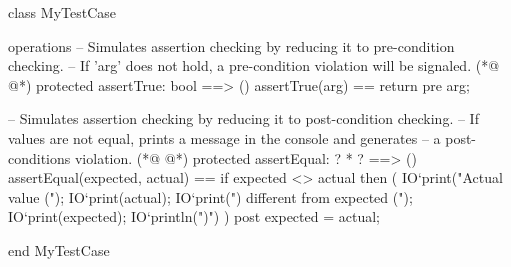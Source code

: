 \begin{vdmpp}[breaklines=true]
class MyTestCase

operations
 -- Simulates assertion checking by reducing it to pre-condition checking.
 -- If 'arg' does not hold, a pre-condition violation will be signaled.
(*@
\label{assertTrue:6}
@*)
 protected assertTrue: bool ==> ()
 assertTrue(arg) == 
  return 
 pre arg;
  
 -- Simulates assertion checking by reducing it to post-condition checking.
 -- If values are not equal, prints a message in the console and generates 
 -- a post-conditions violation.
(*@
\label{assertEqual:14}
@*)
 protected assertEqual: ? * ? ==> ()
 assertEqual(expected, actual) == 
  if expected <> actual then (
    IO`print("Actual value (");
    IO`print(actual); 
    IO`print(") different from expected (");
    IO`print(expected);
    IO`println(")\n")
  )
 post expected = actual;
  
end MyTestCase
\end{vdmpp}
